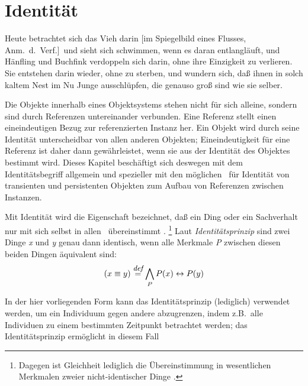 %
\chapter{Identit\"{a}t}%
\label{chap:idty}%
%
\begin{fortune}
Heute betrachtet sich das Vieh darin [im Spiegelbild eines Flusses,
Anm.\ d.\ Verf.]\ und sieht sich schwimmen, wenn es daran
entlangl\"{a}uft, und H\"{a}nfling und Buchfink verdoppeln sich darin, ohne
ihre Einzigkeit zu verlieren. Sie entstehen darin wieder, ohne zu
sterben, und wundern sich, da\ss{} ihnen in solch kaltem Nest im Nu Junge
ausschl\"{u}pfen, die genauso gro\ss{} sind wie sie selber.
\end{fortune}
%
Die Objekte innerhalb eines Objektsystems stehen nicht f\"{u}r sich
alleine, sondern sind durch Referenzen untereinander verbunden. Eine 
Referenz stellt einen eineindeutigen Bezug zur referenzierten Instanz
her. Ein Objekt wird durch seine Identit\"{a}t unterscheidbar von allen
anderen Objekten; Eineindeutigkeit f\"{u}r eine Referenz ist daher dann
gew\"{a}hrleistet, wenn sie aus der Identit\"{a}t des Objektes bestimmt
wird. Dieses Kapitel besch\"{a}ftigt sich deswegen mit dem
Identit\"{a}tsbegriff allgemein und spezieller mit den m\"{o}glichen
\representationforms\ f\"{u}r Identit\"{a}t von transienten und
persistenten Objekten zum Aufbau von Referenzen zwischen Instanzen.
%
\par{}Mit Identit\"{a}t wird die Eigenschaft bezeichnet, da\ss{} ein Ding
oder ein Sachverhalt nur mit sich selbst in allen
\ \"{u}bereinstimmt
\cite[]{bib:kl76} \cite[]{bib:zd90}.%
\footnote{Dagegen ist Gleichheit lediglich die \"{U}bereinstimmung in
wesentlichen Merkmalen zweier nicht-identischer Dinge
\cite[]{bib:schm82}.} Laut {\em Identit\"{a}tsprinzip\/}
sind zwei Dinge {\it x\/} und {\it y\/} genau dann identisch, wenn
alle Merkmale {\it P\/} zwischen diesen beiden Dingen \"{a}quivalent
sind:
%
\begin{equation}
(x \equiv y) %
\stackrel{\mbox{\rm\footnotesize\it def}}{=}
\bigwedge_{P} P(x) \leftrightarrow P(y)
\end{equation}
%
\par{}In der hier vorliegenden Form kann das Identit\"{a}tsprinzip
(lediglich) verwendet werden, um ein Individuum gegen andere
abzugrenzen, indem z.B.\ alle Individuen zu einem bestimmten Zeitpunkt
betrachtet werden; das Identit\"{a}tsprinzip erm\"{o}glicht in diesem Fall
